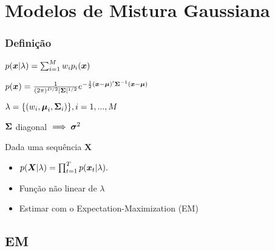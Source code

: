 \section{Modelos de Mistura Gaussiana}
\label{sec:gmm}

\contentscurrent

\begin{frame}
\frametitle{Definição}
\begin{description}\itemsep6pt
    \item[GMM] $p(\boldsymbol{x}|\lambda) = \sum_{i=1}^M w_ip_i(\boldsymbol{x})$
    \item[Gaussiana] $p(\boldsymbol{x}) = \frac{1}{(2\pi)^{D/2}|\boldsymbol{\Sigma}|^{1/2}}e^{-\frac{1}{2}(\boldsymbol{x} - \boldsymbol{\mu})'\boldsymbol{\Sigma}^{-1}(\boldsymbol{x} - \boldsymbol{\mu})}$
    \item $\lambda = \{(w_i, \boldsymbol{\mu}_i, \boldsymbol{\Sigma}_i)\}, i = 1, ..., M$
    \item $\boldsymbol{\Sigma}$ diagonal $\implies \boldsymbol{\sigma}^2$
    \item Dada uma sequência $\boldsymbol{X}$
    \begin{itemize}\itemsep4pt
        \item $p(\boldsymbol{X}|\lambda) = \prod_{t=1}^T p(\boldsymbol{x}_t|\lambda).$
        \item Função não linear de $\lambda$
        \item Estimar com o Expectation-Maximization (EM)
    \end{itemize}
\end{description}
\end{frame}

\subsection{EM}

